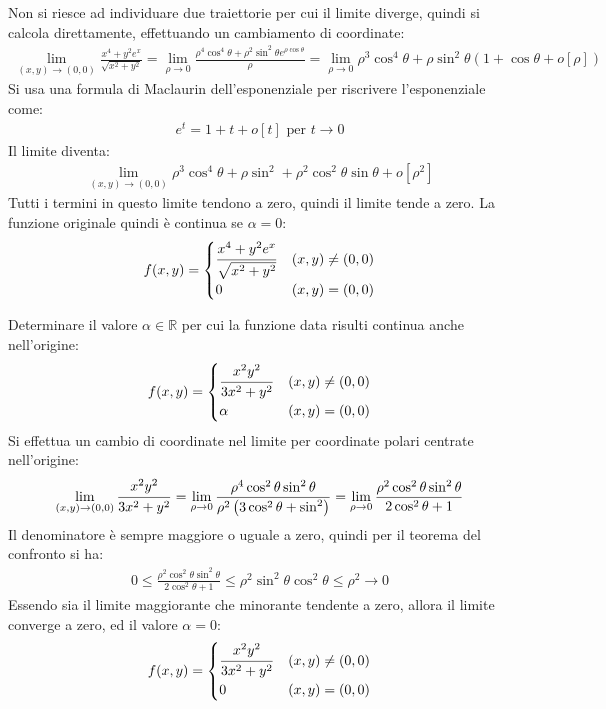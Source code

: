 \documentclass{article}
\numberwithin{equation}{subsection}
\begin{document}
Non si riesce ad individuare due traiettorie per cui il limite diverge, quindi si calcola direttamente, effettuando un cambiamento di coordinate:
\begin{gather*}
    \lim_{(x,y)\to(0,0)}\displaystyle\frac{x^4+y^2e^x}{\sqrt{x^2+y^2}}=
    \lim_{\rho\to0}\frac{\rho^4\cos^4\theta+\rho^2\sin^2\theta e^{\rho\cos\theta}}{\rho}=
    \lim_{\rho\to0}\rho^3\cos^4\theta+\rho\sin^2\theta (1+\cos\theta+o[\rho])
\end{gather*}
Si usa una formula di Maclaurin dell'esponenziale per riscrivere l'esponenziale come:
\begin{gather*}
    e^t=1+t+o[t]\mbox{ per }t\to0
\end{gather*}
Il limite diventa:
\begin{gather*}
    \lim_{(x,y)\to(0,0)}\rho^3\cos^4\theta+\rho\sin^2+\rho^2\cos^2\theta\sin\theta+o[\rho^2]
\end{gather*}
Tutti i termini in questo limite tendono a zero, quindi il limite tende a zero. 
La funzione originale quindi è continua se $\alpha=0$:
\begin{gather*}
    f(x,y)=
    \begin{cases}
        \displaystyle\frac{\strut x^4+y^2e^x}{\strut\sqrt{x^2+y^2}}&(x,y)\neq(0,0)\\
        0&(x,y)=(0,0)    
    \end{cases}
\end{gather*}


Determinare il valore $\alpha\in\mathbb{R}$ per cui la funzione data risulti continua anche nell'origine:
\begin{gather*}
    f(x,y)=
    \begin{cases}
        \displaystyle\frac{\strut x^2y^2}{\strut3x^2+y^2}&(x,y)\neq(0,0)\\
        \alpha&(x,y)=(0,0)    
    \end{cases}
\end{gather*}
Si effettua un cambio di coordinate nel limite per coordinate polari centrate nell'origine:
\begin{gather*}
    \lim_{(x,y)\to(0,0)}\displaystyle\frac{\strut x^2y^2}{\strut3x^2+y^2}=
    \lim_{\rho\to0}\frac{\rho^4\cos^2\theta\sin^2\theta}{\rho^2\left(3\cos^2\theta+\sin^2\right)}=
    \lim_{\rho\to0}\frac{\rho^2\cos^2\theta\sin^2\theta}{2\cos^2\theta+1}
\end{gather*}
Il denominatore è sempre maggiore o uguale a zero, quindi per il teorema del confronto si ha:
\begin{gather*}
    0\leq\frac{\rho^2\cos^2\theta\sin^2\theta}{2\cos^2\theta+1}\leq\rho^2\sin^2\theta\cos^2\theta\leq\rho^2\to0
\end{gather*}
Essendo sia il limite maggiorante che minorante tendente a zero, allora il limite converge a zero, ed il valore $\alpha=0$:
\begin{gather*}
    f(x,y)=
    \begin{cases}
        \displaystyle\frac{\strut x^2y^2}{\strut3x^2+y^2}&(x,y)\neq(0,0)\\
        0&(x,y)=(0,0)    
    \end{cases}
\end{gather*}
\end{document}
